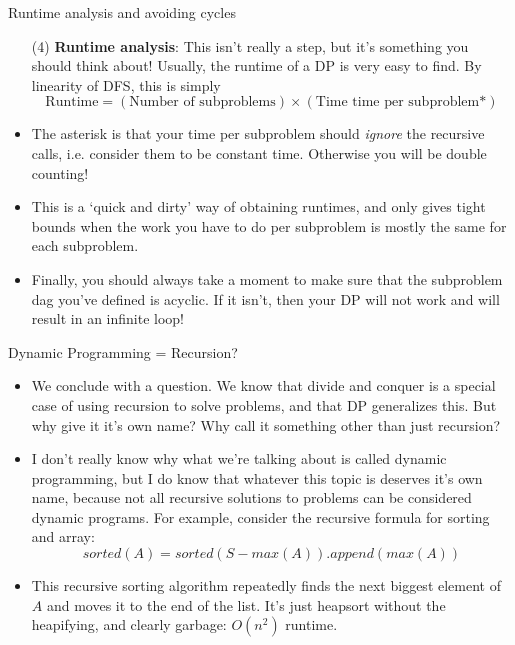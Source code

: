 \documentclass{beamer}
\begin{document}
\begin{frame}{Runtime analysis and avoiding cycles}
    \begin{itemize}
        \item[(4)] \textbf{Runtime analysis}: This isn't really a step, but it's something you should think about! Usually, the runtime of a DP is very easy to find. By linearity of DFS, this is simply
        \[ \textrm{Runtime} = (\textrm{Number of subproblems})\times (\textrm{Time time per subproblem*}) \]
        \item The asterisk is that your time per subproblem should \emph{ignore} the recursive calls, i.e. consider them to be constant time. Otherwise you will be double counting! 
        \item This is a `quick and dirty' way of obtaining runtimes, and only gives tight bounds when the work you have to do per subproblem is mostly the same for each subproblem.
        \item Finally, you should always take a moment to make sure that the subproblem dag you've defined is acyclic. If it isn't, then your DP will not work and will result in an infinite loop!
    \end{itemize}
\end{frame}

\begin{frame}{Dynamic Programming = Recursion?}
    \begin{itemize}
        \item We conclude with a question. We know that divide and conquer is a special case of using recursion to solve problems, and that DP generalizes this. But why give it it's own name? Why call it something other than just recursion? \pause 
        \item I don't really know why what we're talking about is called dynamic programming, but I do know that whatever this topic is deserves it's own name, because not all recursive solutions to problems can be considered dynamic programs. For example, consider the recursive formula for sorting and array:
        \[ sorted(A) = sorted(S-max(A)).append(max(A)) \]
        \item This recursive sorting algorithm repeatedly finds the next biggest element of $A$ and moves it to the end of the list. It's just heapsort without the heapifying, and clearly garbage: $O(n^2)$ runtime.  
    \end{itemize}
\end{frame}
\end{document}
